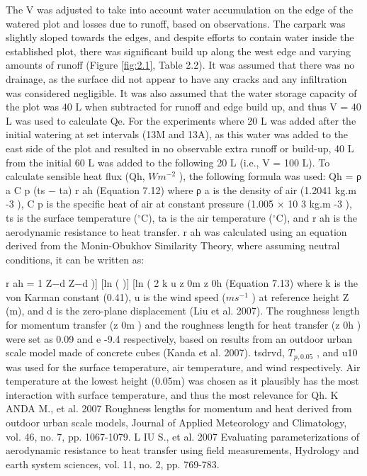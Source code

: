 \documentclass[final,3p,times,authoryear]{elsarticle}
\begin{document}
{The V was adjusted to take into account water accumulation on the edge of the watered
plot and losses due to runoff, based on observations. The carpark was slightly sloped
towards the edges, and despite efforts to contain water inside the established plot, there
was significant build up along the west edge and varying amounts of runoff (Figure \ref{fig:2.1},
Table 2.2). It was assumed that there was no drainage, as the surface did not appear to
have any cracks and any infiltration was considered negligible. It was also assumed that
the water storage capacity of the plot was 40 L when subtracted for runoff and edge
build up, and thus V = 40 L was used to calculate \gls{Qe}. For the experiments where 20 L
was added after the initial watering at set intervals (13M and 13A), as this water was
added to the east side of the plot and resulted in no observable extra runoff or build-up,
40 L from the initial 60 L was added to the following 20 L (i.e., V = 100 L).
To calculate sensible heat flux (\gls{Qh}, $Wm^{-2}$ ), the following formula was used:
\gls{Qh} = ρ a C p
(\gls{ts} − \gls{ta})
r ah
(Equation 7.12)
where ρ a is the density of air (1.2041 kg.m -3 ), C p is the specific heat of air at constant
pressure (1.005 × 10 3 kg.m -3 ), \gls{ts} is the surface temperature ($^{\circ}$C), \gls{ta} is the air
temperature ($^{\circ}$C), and r ah is the aerodynamic resistance to heat transfer. r ah was
calculated using an equation derived from the Monin-Obukhov Similarity Theory,
where assuming neutral conditions, it can be written as:

r ah =
1
Z−d
Z−d
)] [ln (
)]
[ln (
2
k u
z 0m
z 0h
(Equation 7.13)
where k is the von Karman constant (0.41), \gls{u} is the wind speed ($ms^{-1}$ ) at reference
height Z (m), and d is the zero-plane displacement (Liu et al. 2007).
The roughness length for momentum transfer (z 0m ) and the roughness length for heat
transfer (z 0h ) were set as 0.09 and e -9.4 respectively, based on results from an outdoor
urban scale model made of concrete cubes (Kanda et al. 2007). \gls{tsdrvd}, $T_{p,0.05}$ , and \gls{u10}
was used for the surface temperature, air temperature, and wind respectively. Air
temperature at the lowest height (0.05m) was chosen as it plausibly has the most
interaction with surface temperature, and thus the most relevance for \gls{Qh}.
K ANDA M., et al. 2007 Roughness lengths for momentum and heat derived from outdoor urban
scale models, Journal of Applied Meteorology and Climatology, vol. 46, no. 7, pp.
1067-1079.
L IU S., et al. 2007 Evaluating parameterizations of aerodynamic resistance to heat transfer using
field measurements, Hydrology and earth system sciences, vol. 11, no. 2, pp. 769-783.

}
\end{document}
